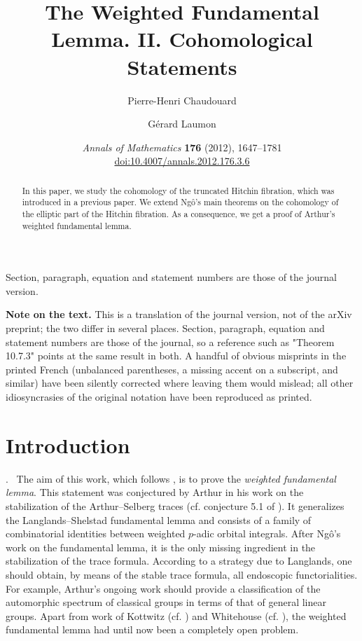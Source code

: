 \documentclass[12pt,a4paper,oneside,english,leqno]{smfart}
\title[The Weighted Fundamental Lemma. II]{The Weighted Fundamental Lemma. II. Cohomological Statements}
\author{Pierre-Henri Chaudouard \and G\'erard Laumon}
\date{\emph{Annals of Mathematics} \textbf{176} (2012), 1647--1781\\
\href{https://doi.org/10.4007/annals.2012.176.3.6}{doi:10.4007/annals.2012.176.3.6}}
\makeatletter
\numberwithin{equation}{subsection}
\newcounter{theo}
\numberwithin{theo}{subsection}
\newenvironment{paragr}[1][]{\medskip\refstepcounter{subsection}%
  \par\noindent\hspace*{\parindent}\thesubsection.\ \emph{#1}%
  \@ifundefined{@empty}{}{}\ignorespaces}{\medskip}
\theoremstyle{plain}
\theoremstyle{definition}
\theoremstyle{remark}
\makeatother
\begin{document}
\begin{abstract}
In this paper, we study the cohomology of the truncated Hitchin fibration, which was introduced in a previous paper. We extend Ng\^o's main theorems on the cohomology of the elliptic part of the Hitchin fibration. As a consequence, we get a proof of Arthur's weighted fundamental lemma.
\end{abstract}

\maketitle

\begin{center}\small
Section, paragraph, equation and statement numbers are those of the journal version.
\end{center}
\bigskip

\begin{center}
\begin{minipage}{0.86\textwidth}\small
\textbf{Note on the text.} This is a translation of the journal version, not of the arXiv preprint; the two differ in several places. Section, paragraph, equation and statement numbers are those of the journal, so a reference such as "Theorem 10.7.3" points at the same result in both. A handful of obvious misprints in the printed French (unbalanced parentheses, a missing accent on a subscript, and similar) have been silently corrected where leaving them would mislead; all other idiosyncrasies of the original notation have been reproduced as printed.
\end{minipage}
\end{center}
\bigskip

\renewcommand{\contentsname}{Contents}
\tableofcontents
\bigskip
\section{Introduction}\label{sec:1}

\begin{paragr}\label{S:1.1} The aim of this work, which follows \cite{LFPI}, is to prove the \emph{weighted fundamental lemma}. This statement was conjectured by Arthur in his work on the stabilization of the Arthur--Selberg traces (cf. conjecture 5.1 of \cite{Arthur-stable-I}). It generalizes the Langlands–Shelstad fundamental lemma and consists of a family of combinatorial identities between weighted $p$-adic orbital integrals. After Ng\^o's work on the fundamental lemma, it is the only missing ingredient in the stabilization of the trace formula. According to a strategy due to Langlands, one should obtain, by means of the stable trace formula, all endoscopic functorialities. For example, Arthur’s ongoing work should provide a classification of the automorphic spectrum of classical groups in terms of that of general linear groups. Apart from work of Kottwitz (cf. \cite{Kottwitz-basechange}) and Whitehouse (cf. \cite{Whitehouse}), the weighted fundamental lemma had until now been a completely open problem.
\end{paragr}
\end{document}
